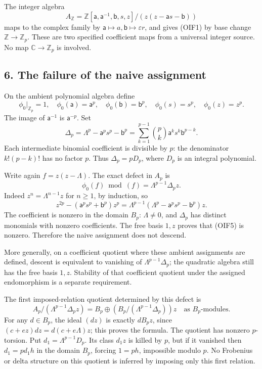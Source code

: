 \documentclass[
]{article}
\begin{document}
The integer algebra \[
A_{\mathbb Z}=
\mathbb Z[\mathsf a,\mathsf a^{-1},\mathsf b,s,z]/
(z(z-\mathsf a s-\mathsf b))
\] maps to the complex family by
\(\mathsf a\mapsto a,\mathsf b\mapsto\varepsilon r\), and gives (OIF1)
by base change \(\mathbb Z\to\mathbb Z_p\). These are two specified
coefficient maps from a universal integer source. No map
\(\mathbb C\to\mathbb Z_p\) is involved.

\subsection{6. The failure of the naive
assignment}\label{the-failure-of-the-naive-assignment}

On the ambient polynomial algebra define \[
\phi_0|_{\mathbb Z_p}=1,\quad
\phi_0(\mathsf a)=\mathsf a^p,\quad
\phi_0(\mathsf b)=\mathsf b^p,\quad
\phi_0(s)=s^p,\quad\phi_0(z)=z^p.
\tag{OIF3}
\] The image of \(\mathsf a^{-1}\) is \(\mathsf a^{-p}\). Set \[
\Delta_p=\Lambda^p-\mathsf a^ps^p-\mathsf b^p
=\sum_{k=1}^{p-1}\binom pk\mathsf a^ks^k\mathsf b^{p-k}.
\tag{OIF4}
\] Each intermediate binomial coefficient is divisible by \(p\): the
denominator \(k!(p-k)!\) has no factor \(p\). Thus \(\Delta_p=pD_p\),
where \(D_p\) is an integral polynomial.

Write again \(f=z(z-\Lambda)\). The exact defect in \(A_p\) is \[
\boxed{\phi_0(f)\bmod(f)=\Lambda^{p-1}\Delta_p z.}
\tag{OIF5}
\] Indeed \(z^n=\Lambda^{n-1}z\) for \(n\ge1\), by induction, so \[
z^{2p}-(\mathsf a^ps^p+\mathsf b^p)z^p
=\Lambda^{p-1}(\Lambda^p-\mathsf a^ps^p-\mathsf b^p)z.
\] The coefficient is nonzero in the domain \(B_p\): \(\Lambda\ne0\),
and \(\Delta_p\) has distinct monomials with nonzero coefficients. The
free basis \(1,z\) proves that (OIF5) is nonzero. Therefore the naive
assignment does not descend.

More generally, on a coefficient quotient where these ambient
assignments are defined, descent is equivalent to vanishing of
\(\Lambda^{p-1}\Delta_p\); the quadratic algebra still has the free
basis \(1,z\). Stability of that coefficient quotient under the assigned
endomorphism is a separate requirement.

The first imposed-relation quotient determined by this defect is \[
A_p/(\Lambda^{p-1}\Delta_pz)
=B_p\oplus
(B_p/(\Lambda^{p-1}\Delta_p))z
\quad\text{as }B_p\text{-modules}.
\tag{OIF6}
\] For any \(d\in B_p\), the ideal \((dz)\) is exactly \(dB_pz\), since
\((c+ez)dz=d(c+e\Lambda)z\); this proves the formula. The quotient has
nonzero \(p\)-torsion. Put \(d_1=\Lambda^{p-1}D_p\). Its class \(d_1z\)
is killed by \(p\), but if it vanished then \(d_1=pd_1h\) in the domain
\(B_p\), forcing \(1=ph\), impossible modulo \(p\). No Frobenius or
delta structure on this quotient is inferred by imposing only this first
relation.
\end{document}
